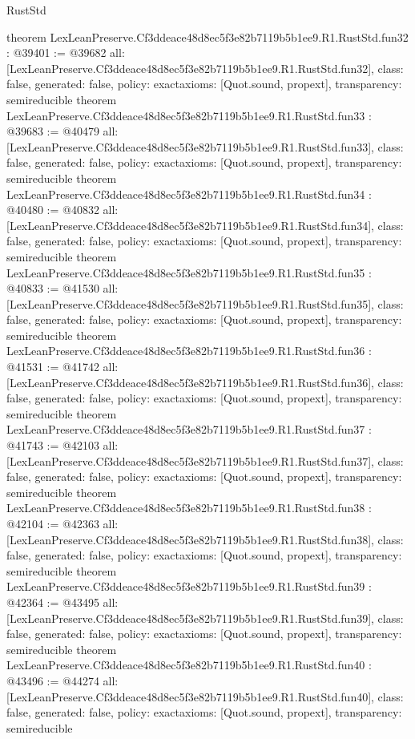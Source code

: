 \begin{lexlean}{RustStd}
\begin{coremodule}
{}
theorem LexLeanPreserve.Cf3ddeace48d8ec5f3e82b7119b5b1ee9.R1.RustStd.fun32 : @39401 := @39682 {
  all: [LexLeanPreserve.Cf3ddeace48d8ec5f3e82b7119b5b1ee9.R1.RustStd.fun32],
  class: false,
  generated: false,
  policy: exact{axioms: [Quot.sound, propext]},
  transparency: semireducible
}
theorem LexLeanPreserve.Cf3ddeace48d8ec5f3e82b7119b5b1ee9.R1.RustStd.fun33 : @39683 := @40479 {
  all: [LexLeanPreserve.Cf3ddeace48d8ec5f3e82b7119b5b1ee9.R1.RustStd.fun33],
  class: false,
  generated: false,
  policy: exact{axioms: [Quot.sound, propext]},
  transparency: semireducible
}
theorem LexLeanPreserve.Cf3ddeace48d8ec5f3e82b7119b5b1ee9.R1.RustStd.fun34 : @40480 := @40832 {
  all: [LexLeanPreserve.Cf3ddeace48d8ec5f3e82b7119b5b1ee9.R1.RustStd.fun34],
  class: false,
  generated: false,
  policy: exact{axioms: [Quot.sound, propext]},
  transparency: semireducible
}
theorem LexLeanPreserve.Cf3ddeace48d8ec5f3e82b7119b5b1ee9.R1.RustStd.fun35 : @40833 := @41530 {
  all: [LexLeanPreserve.Cf3ddeace48d8ec5f3e82b7119b5b1ee9.R1.RustStd.fun35],
  class: false,
  generated: false,
  policy: exact{axioms: [Quot.sound, propext]},
  transparency: semireducible
}
theorem LexLeanPreserve.Cf3ddeace48d8ec5f3e82b7119b5b1ee9.R1.RustStd.fun36 : @41531 := @41742 {
  all: [LexLeanPreserve.Cf3ddeace48d8ec5f3e82b7119b5b1ee9.R1.RustStd.fun36],
  class: false,
  generated: false,
  policy: exact{axioms: [Quot.sound, propext]},
  transparency: semireducible
}
theorem LexLeanPreserve.Cf3ddeace48d8ec5f3e82b7119b5b1ee9.R1.RustStd.fun37 : @41743 := @42103 {
  all: [LexLeanPreserve.Cf3ddeace48d8ec5f3e82b7119b5b1ee9.R1.RustStd.fun37],
  class: false,
  generated: false,
  policy: exact{axioms: [Quot.sound, propext]},
  transparency: semireducible
}
theorem LexLeanPreserve.Cf3ddeace48d8ec5f3e82b7119b5b1ee9.R1.RustStd.fun38 : @42104 := @42363 {
  all: [LexLeanPreserve.Cf3ddeace48d8ec5f3e82b7119b5b1ee9.R1.RustStd.fun38],
  class: false,
  generated: false,
  policy: exact{axioms: [Quot.sound, propext]},
  transparency: semireducible
}
theorem LexLeanPreserve.Cf3ddeace48d8ec5f3e82b7119b5b1ee9.R1.RustStd.fun39 : @42364 := @43495 {
  all: [LexLeanPreserve.Cf3ddeace48d8ec5f3e82b7119b5b1ee9.R1.RustStd.fun39],
  class: false,
  generated: false,
  policy: exact{axioms: [Quot.sound, propext]},
  transparency: semireducible
}
theorem LexLeanPreserve.Cf3ddeace48d8ec5f3e82b7119b5b1ee9.R1.RustStd.fun40 : @43496 := @44274 {
  all: [LexLeanPreserve.Cf3ddeace48d8ec5f3e82b7119b5b1ee9.R1.RustStd.fun40],
  class: false,
  generated: false,
  policy: exact{axioms: [Quot.sound, propext]},
  transparency: semireducible
}
\end{coremodule}
\end{lexlean}
